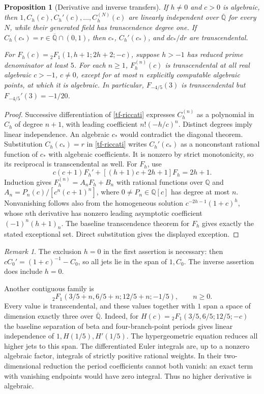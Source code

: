 \documentclass[11pt,a4paper]{article}
\newtheorem{proposition}[theorem]{Proposition}
\theoremstyle{definition}
\theoremstyle{remark}
\newtheorem{remark}[theorem]{Remark}
\numberwithin{equation}{section}
\newcommand{\Qbar}{\overline{\mathbb Q}}
\begin{document}
\begin{proposition}[Derivative and inverse transfers]\label{tf-jets}
If $h\ne0$ and $c>0$ is algebraic, then
$1,C_h(c),C_h'(c),\ldots,C_h^{(N)}(c)$ are linearly independent over
$\Qbar$ for every $N$, while their generated field has transcendence
degree one.  If $C_h(c_*)=r\in\Qbar\cap(0,1)$, then $c_*$,
$C_h'(c_*)$, and $dc_*/dr$ are transcendental.

For $F_h(c)={}_2F_1(1,h+1;2h+2;-c)$, suppose $h>-1$ has reduced
prime denominator at least $5$.  For each $n\ge1$, $F_h^{(n)}(c)$
is transcendental at all real algebraic $c>-1$, $c\ne0$, except for
at most $n$ explicitly computable algebraic points, at which it is
algebraic.  In particular, $F_{-4/5}(3)$ is transcendental but
$F_{-4/5}'(3)=-1/20$.
\end{proposition}
\begin{proof}
Successive differentiation of \eqref{tf-riccati} expresses $C_h^{(n)}$
as a polynomial in $C_h$ of degree $n+1$, with leading coefficient
$n!(-h/c)^n$.  Distinct degrees imply linear independence.
An algebraic $c_*$ would contradict the diagonal theorem.  Substitution
$C_h(c_*)=r$ in \eqref{tf-riccati} writes $C_h'(c_*)$ as a nonconstant
rational function of $c_*$ with algebraic coefficients.  It is nonzero
by strict monotonicity, so its reciprocal is transcendental as well.
For $F_h$, use
\[
 c(c+1)F_h'+[(h+1)c+2h+1]F_h=2h+1.
\]
Induction gives $F_h^{(n)}=A_nF_h+B_n$ with rational functions over
$\mathbb Q$ and $A_n=P_n(c)/[c^n(c+1)^n]$, where
$0\ne P_n\in\mathbb Q[c]$ has degree at most $n$.
Nonvanishing follows also from the homogeneous solution
$c^{-2h-1}(1+c)^h$, whose $n$th derivative has nonzero leading
asymptotic coefficient $(-1)^n(h+1)_n$.
The baseline transcendence theorem for $F_h$ gives exactly the stated
exceptional set.  Direct substitution gives the displayed exception.
\end{proof}

\begin{remark}\label{tf-jet-correction}
The exclusion $h=0$ in the first assertion is necessary: then
$cC_0'=(1+c)^{-1}-C_0$, so all jets lie in the span of $1,C_0$.
The inverse assertion does include $h=0$.
\end{remark}

Another contiguous family is
\begin{equation}\label{tf-contiguous}
 {}_2F_1(3/5+n,6/5+n;12/5+n;-1/5),\qquad n\ge0.
\end{equation}
Every value is transcendental, and these values together with $1$ span
a space of dimension exactly three over $\Qbar$.
Indeed, for $H(c)={}_2F_1(3/5,6/5;12/5;-c)$ the baseline separation
of beta and four-branch-point periods gives linear independence of
$1,H(1/5),H'(1/5)$.  The hypergeometric equation reduces all higher
jets to this span.  The differentiated Euler integrals are, up to a
nonzero algebraic factor, integrals of strictly positive rational
weights.  In their two-dimensional reduction the period coefficients
cannot both vanish: an exact term with vanishing endpoints would have
zero integral.  Thus no higher derivative is algebraic.
\end{document}
